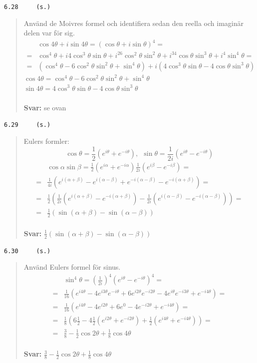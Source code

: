 \documentclass[a4paper]{article}
\newcommand{\tskcol}[1]{\textcolor{tskcol}{#1}}
\begin{document}
	\pagebreak
	\texttt{\tskcol{6.28~~~~ (s.)}}
	\begin{quotation}
		\noindent
		Använd de Moivres formel och identifiera sedan den reella och imaginär delen var för sig.
		\begin{align*}
		&\cos4\theta+i\sin4\theta=
		(\cos\theta+i\sin\theta)^4= \\=
		&\cos^4\theta+i4\cos^3\theta\sin\theta+i^26\cos^2\theta\sin^2\theta+i^34\cos\theta\sin^3\theta+i^4\sin^4\theta= \\=
		&(\cos^4\theta-6\cos^2\theta\sin^2\theta+\sin^4\theta)+i(4\cos^3\theta\sin\theta-4\cos\theta\sin^3\theta)
		\end{align*}
		$\cos4\theta=\cos^4\theta-6\cos^2\theta\sin^2\theta+\sin^4\theta$ \\
		$\sin4\theta=4\cos^3\theta\sin\theta-4\cos\theta\sin^3\theta$
		\\ \\
		\textbf{Svar:} se ovan
	\end{quotation}
	
	\texttt{\tskcol{6.29~~~~ (s.)}}
	\begin{quotation}
		\noindent
		Eulers formler:
		\[\cos\theta=\frac{1}{2}(e^{i\theta}+e^{-i\theta}),~~\sin\theta=\frac{1}{2i}(e^{i\theta}-e^{-i\theta})\]
		\begin{align*}
		&\cos\alpha\sin\beta=
		\frac{1}{2}(e^{i\alpha}+e^{-i\alpha})\frac{1}{2i}(e^{i\beta}-e^{-i\beta})= \\ =
		&\frac{1}{4i}(e^{i(\alpha+\beta)}-e^{i(\alpha-\beta)}+e^{-i(\alpha-\beta)}-e^{-i(\alpha+\beta)})= \\ =
		&\frac{1}{2}\left(\frac{1}{2i}(e^{i(\alpha+\beta)}-e^{-i(\alpha+\beta)})-\frac{1}{2i}(e^{i(\alpha-\beta)}-e^{-i(\alpha-\beta)})\right)= \\ =
		&\frac{1}{2}(\sin(\alpha+\beta)-\sin(\alpha-\beta))
		\end{align*} 
		\\
		\textbf{Svar:} $\frac{1}{2}(\sin(\alpha+\beta)-\sin(\alpha-\beta))$
	\end{quotation}
	
	\texttt{\tskcol{6.30~~~~ (s.)}}
	\begin{quotation}
		\noindent
		Använd Eulers formel för sinus.
		\begin{align*}
		&\sin^4\theta=
		(\tfrac{1}{2i})^4(e^{i\theta}-e^{-i\theta})^4= \\ =
		&\frac{1}{16}(e^{i4\theta}-4e^{i3\theta}e^{-i\theta}+6e^{i2\theta}e^{-i2\theta}-4e^{i\theta}e^{-i3\theta}+e^{-i4\theta})= \\ =
		&\frac{1}{16}(e^{i4\theta}-4e^{i2\theta}+6e^{0}-4e^{-i2\theta}+e^{-i4\theta})= \\ =
		&\frac{1}{8}(6\frac{1}{2}-4\frac{1}{2}(e^{i2\theta}+e^{-i2\theta})+\frac{1}{2}(e^{i4\theta}+e^{-i4\theta}))= \\ =
		&\frac{3}{8}-\frac{1}{2}\cos 2\theta+\frac{1}{8}\cos 4\theta
		\end{align*}
		\\
		\textbf{Svar:} $\frac{3}{8}-\frac{1}{2}\cos 2\theta+\frac{1}{8}\cos 4\theta$
	\end{quotation}
	
\end{document}
